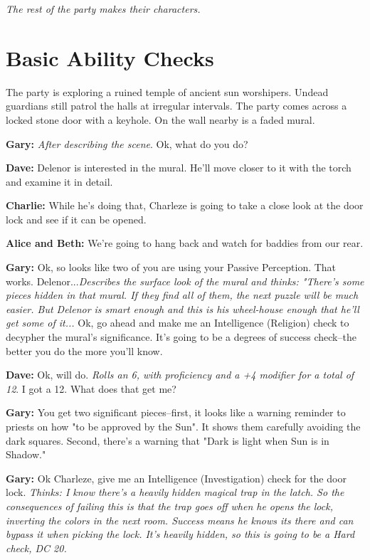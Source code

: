 \textit{The rest of the party makes their characters.}

\section{Basic Ability Checks}\label{example:ability-checks-basic}
The party is exploring a ruined temple of ancient sun worshipers. Undead guardians still patrol the halls at irregular intervals. The party comes across a locked stone door with a keyhole. On the wall nearby is a faded mural.

\textbf{Gary:} \textit{After describing the scene}. Ok, what do you do?

\textbf{Dave:} Delenor is interested in the mural. He'll move closer to it with the torch and examine it in detail.

\textbf{Charlie:} While he's doing that, Charleze is going to take a close look at the door lock and see if it can be opened.

\textbf{Alice and Beth:} We're going to hang back and watch for baddies from our rear.

\textbf{Gary:} Ok, so looks like two of you are using your Passive Perception. That works. Delenor...\textit{Describes the surface look of the mural and thinks: "There's some pieces hidden in that mural. If they find all of them, the next puzzle will be much easier. But Delenor is smart enough and this is his wheel-house enough that he'll get some of it...} Ok, go ahead and make me an Intelligence (Religion) check to decypher the mural's significance. It's going to be a degrees of success check--the better you do the more you'll know.

\textbf{Dave:} Ok, will do. \textit{Rolls an 6, with proficiency and a +4 modifier for a total of 12}. I got a 12. What does that get me?

\textbf{Gary:} You get two significant pieces--first, it looks like a warning reminder to priests on how "to be approved by the Sun". It shows them carefully avoiding the dark squares. Second, there's a warning that "Dark is light when Sun is in Shadow."

\textbf{Gary:} Ok Charleze, give me an Intelligence (Investigation) check for the door lock. \textit{Thinks: I know there's a heavily hidden magical trap in the latch. So the consequences of failing this is that the trap goes off when he opens the lock, inverting the colors in the next room. Success means he knows its there and can bypass it when picking the lock. It's heavily hidden, so this is going to be a Hard check, DC 20.}

